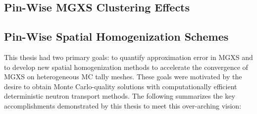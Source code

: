 \subsection{Pin-Wise MGXS Clustering Effects}
\label{subsec:chap12-mgxs-clustering}

\subsection{Pin-Wise Spatial Homogenization Schemes}
\label{subsec:chap12-homogenization-schemes}

This thesis had two primary goals: to quantify approximation error in MGXS and to develop new spatial homogenization methods to accelerate the convergence of MGXS on heterogeneous MC tally meshes. These goals were motivated by the desire to obtain Monte Carlo-quality solutions with computationally efficient deterministic neutron transport methods. The following summarizes the key accomplishments demonstrated by this thesis to meet this over-arching vision:



